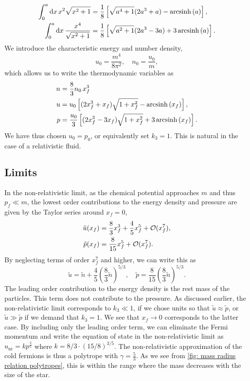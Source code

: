 %
\begin{align}
    \int_0^a \text{d} x \, x^2 \sqrt{x^2 + 1} 
    & = \frac{1}{8} 
    \left[\sqrt{a^4 + 1}(2 a^3 + a) - \operatorname{arcsinh}\left(a\right)\right], \\
    \int_0^a \text{d} x \, \frac{x^4}{\sqrt{x^2 + 1} }
    & = \frac{1}{8} 
    \left[\sqrt{a^2 + 1}(2 a^3 - 3a) + 3\operatorname{arcsinh}\left(a\right)\right].
\end{align}
%
We introduce the characteristic energy and number density,
% 
\begin{equation}
    u_0 = \frac{m^4}{8 \pi^2}, \quad n_0 = \frac{u_0}{m},
\end{equation}
%
which allows us to write the thermodynamic variables as
%
\begin{align}
    \label{Fermi gas particle density}
    n &= \frac{8}{3}  n_0 \,x_f^3 \\
    \label{Fermi gas energy density}
    u &= u_0
    \left[(2x_f^3 + x_f) \sqrt{1 + x_f^2} - \operatorname{arcsinh}\left(x_f\right)\right], \\
    \label{Fermi gas pressure}
    p &= \frac{u_0}{3}
    \left[(2x_f^3 - 3x_f) \sqrt{1 + x_f^2} + 3\operatorname{arcsinh}\left(x_f\right)\right].
\end{align}
%
We have thus chosen $u_0 = p_0$, or equivalently set $k_3 = 1$.
This is natural in the case of a relativistic fluid.




\subsection{Limits}

In the non-relativistic limit, as the chemical potential approaches $m$ and thus $p_f \ll m$, the lowest order contributions to the energy density and pressure are given by the Taylor series around $x_f = 0$,
%
\begin{align}
    \tilde u(x_f) &= \frac{8}{3}x_f^3 + \frac{4}{5} x_f^5 + \mathcal O(x_f^7),  \\
    \tilde p(x_f) &= \frac{8}{15}x_f^5 + \mathcal O(x_f^7).
\end{align}
%
By neglecting terms of order $x_f^7$ and higher, we can write this as
%
\begin{equation}
    \tilde u = \tilde n + \frac{4}{5} \left( \frac{8}{3} \tilde n \right)^{5/3},
    \quad
    \tilde p =  \frac{8}{15} \left( \frac{8}{3} \tilde n \right)^{5/3}.
\end{equation}
%
The leading order contribution to the energy density is the rest mass of the particles.
This term does not contribute to the pressure.
As discussed earlier, the non-relativistic limit corresponds to $k_3 \ll 1$, if we chose units so that $\tilde u \approx \tilde p$, or $\tilde u \gg \tilde p$ if we demand that $k_3 = 1$.
We see that $x_f \rightarrow 0$ corresponds to the latter case.
By including only the leading order term, we can eliminate the Fermi momentum and write the equation of state in the non-relativistic limit as $u_{\mathrm{nr}} = k p^\frac{3}{5}$ where $k = 8/3 \cdot (15/8)^{3/5}$.
The non-relativistic approximation of the cold fermions is thus a polytrope with $\gamma = \frac{5}{3}$.
As we see from \autoref{fig: mass radius relation polytropes}, this is within the range where the mass decreases with the size of the star.


